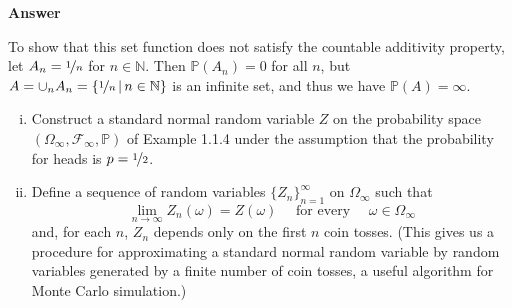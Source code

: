 \documentclass[11pt]{article}
\renewcommand\P{\mathbb{P}} %
\newcommand\cF{\mathcal{F}}
\newcounter{question}[section]
\newenvironment{hwanswer}
    {
        \vspace{2mm}
        {\bfseries Answer}
        \vspace{-\abovedisplayskip}
        \begin{center}
            \begin{tcolorbox}[
                width=0.95\textwidth,
                colback=white,
                colframe=white,
                opacityback=0,
                opacityframe=0,
                boxrule=0pt,
                frame hidden,
                breakable,
                before upper={\parindent15pt} %
            ]
            \lineskip=0pt %
    }
    {
        \end{tcolorbox}
        \end{center}
        \vspace{4mm}
    }
\begin{document}
\begin{hwanswer}
        To show that this set function does not satisfy the countable additivity property,
        let $A_{n} = \nicefrac{1}{n}$ for $n \in \mathbb{N}$. Then $\P(A_{n}) = 0$ for all
        $n$, but $A = \cup_{n} A_{n} = \{ \nicefrac{1}{n} \, | \, n \in \mathbb{N} \}$ is an
        infinite set, and thus we have $\P(A) = \infty$.
    \end{hwanswer}





    \begin{hwquestion}
        \begin{enumerate}[(i), nolistsep]
            \item Construct a standard normal random variable $Z$ on the probability space
            $(\Omega_{\infty}, \cF_{\infty}, \P)$ of Example 1.1.4 under the assumption that
            the probability for heads is $p = \nicefrac{1}{2}$.

            \item Define a sequence of random variables $\{ Z_n \}_{n=1}^{\infty}$ on
            $\Omega_{\infty}$ such that
            \[
                \lim_{n \to \infty} Z_n(\omega) = Z(\omega)
                \quad \text{ for every } \quad
                \omega \in \Omega_{\infty}
            \]
            and, for each $n$, $Z_n$ depends only on the first $n$ coin tosses. (This gives
            us a procedure for approximating a standard normal random variable by random
            variables generated by a finite number of coin tosses, a useful algorithm for
            Monte Carlo simulation.)
        \end{enumerate}
    \end{hwquestion}
\end{document}
